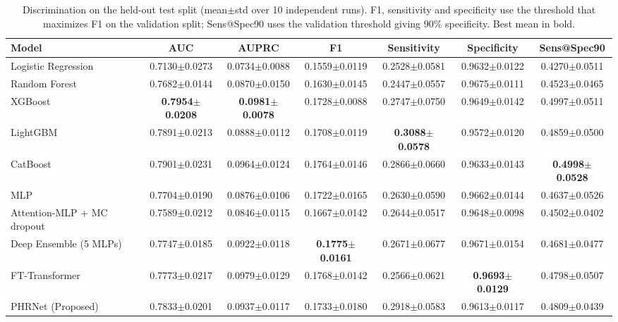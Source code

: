 \begin{table}[t]
\centering
\caption{Discrimination on the held-out test split (mean$\pm$std over 10 independent runs). F1, sensitivity and specificity use the threshold that maximizes F1 on the validation split; Sens@Spec90 uses the validation threshold giving 90\% specificity. Best mean in bold.}
\label{tab:performance}
\footnotesize
\setlength{\tabcolsep}{3pt}
\renewcommand{\arraystretch}{1.15}
\begin{tabular}{lcccccc}
\toprule
\textbf{Model} & \textbf{AUC} & \textbf{AUPRC} & \textbf{F1} & \textbf{Sensitivity} & \textbf{Specificity} & \textbf{Sens@Spec90} \\
\midrule
Logistic Regression & 0.7130$\pm$0.0273 & 0.0734$\pm$0.0088 & 0.1559$\pm$0.0119 & 0.2528$\pm$0.0581 & 0.9632$\pm$0.0122 & 0.4270$\pm$0.0511 \\
Random Forest & 0.7682$\pm$0.0144 & 0.0870$\pm$0.0150 & 0.1630$\pm$0.0145 & 0.2447$\pm$0.0557 & 0.9675$\pm$0.0111 & 0.4523$\pm$0.0465 \\
XGBoost & \textbf{0.7954$\pm$0.0208} & \textbf{0.0981$\pm$0.0078} & 0.1728$\pm$0.0088 & 0.2747$\pm$0.0750 & 0.9649$\pm$0.0142 & 0.4997$\pm$0.0511 \\
LightGBM & 0.7891$\pm$0.0213 & 0.0888$\pm$0.0112 & 0.1708$\pm$0.0119 & \textbf{0.3088$\pm$0.0578} & 0.9572$\pm$0.0120 & 0.4859$\pm$0.0500 \\
CatBoost & 0.7901$\pm$0.0231 & 0.0964$\pm$0.0124 & 0.1764$\pm$0.0146 & 0.2866$\pm$0.0660 & 0.9633$\pm$0.0143 & \textbf{0.4998$\pm$0.0528} \\
MLP & 0.7704$\pm$0.0190 & 0.0876$\pm$0.0106 & 0.1722$\pm$0.0165 & 0.2630$\pm$0.0590 & 0.9662$\pm$0.0144 & 0.4637$\pm$0.0526 \\
Attention-MLP + MC dropout & 0.7589$\pm$0.0212 & 0.0846$\pm$0.0115 & 0.1667$\pm$0.0142 & 0.2644$\pm$0.0517 & 0.9648$\pm$0.0098 & 0.4502$\pm$0.0402 \\
Deep Ensemble (5 MLPs) & 0.7747$\pm$0.0185 & 0.0922$\pm$0.0118 & \textbf{0.1775$\pm$0.0161} & 0.2671$\pm$0.0677 & 0.9671$\pm$0.0154 & 0.4681$\pm$0.0477 \\
FT-Transformer & 0.7773$\pm$0.0217 & 0.0979$\pm$0.0129 & 0.1768$\pm$0.0142 & 0.2566$\pm$0.0621 & \textbf{0.9693$\pm$0.0129} & 0.4798$\pm$0.0507 \\
PHRNet (Proposed) & 0.7833$\pm$0.0201 & 0.0937$\pm$0.0117 & 0.1733$\pm$0.0180 & 0.2918$\pm$0.0583 & 0.9613$\pm$0.0117 & 0.4809$\pm$0.0439 \\
\bottomrule
\end{tabular}
\end{table}